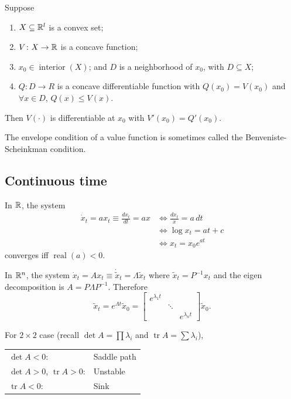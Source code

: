 \documentclass[8pt,letterpaper, landscape]{extarticle} %
\renewcommand{\ln}{\log}
\begin{document}
\begin{multicols}{3}
\begin{description}
 Suppose
\begin{enumerate}
\item $ X \subseteq \mathbb{R}^l $ is a convex set;
\item $ V \colon X \to \mathbb{R} $ is a concave function;
\item $ x_0 \in \operatorname{interior}(X) $; and $ D $ is a neighborhood of $ x_0 $, with $ D \subseteq X $;
\item $ Q \colon D \to R $ is a concave differentiable function with $ Q(x_0) = V(x_0) $ and $ \forall x \in D $, $ Q(x) \leq V(x) $.
\end{enumerate}
Then $ V(\cdot) $ is differentiable at $ x_0 $ with $ V'(x_0) = Q'(x_0) $.

The envelope condition of a value function is sometimes called the Benveniste-Scheinkman condition.

\subsection{Continuous time}
 In $ \mathbb{R} $, the system
\begin{align*}
\dot{x}_t = ax_t \equiv \tfrac{dx_t}{dt} = ax &\iff \tfrac{dx_t}{x} = a \, dt \\
&\iff \ln x_t = at + c \\
&\iff x_t = x_0 e^{at}
\end{align*}
converges iff $ \operatorname{real}(a) < 0 $.

In $ \mathbb{R}^n $, the system $ \dot{x}_t = Ax_t \equiv \dot{\tilde{x}}_t = \Lambda \tilde{x}_t $ where $ \tilde{x}_t = P^{-1} x_t $ and the eigen decomposition is $ A = P \Lambda P^{-1} $. Therefore
$$ \tilde{x}_t = e^{\Lambda t} \tilde{x}_0 = \begin{bmatrix}
e^{\lambda_1 t} & & \\ 
& \ddots & \\
& & e^{\lambda_n t}
\end{bmatrix} \tilde{x}_0. $$

For $ 2 \times 2 $ case (recall $ \det A = \prod \lambda_i $ and $ \operatorname{tr} A = \sum \lambda_i $),
\begin{center}
\begin{tabular}{ll}
$ \det A < 0 $: & Saddle path \\
$ \det A > 0 $, $ \operatorname{tr} A > 0 $: & Unstable \\
\phantom{$ \det A > 0 $,} $ \operatorname{tr} A < 0 $: & Sink
\end{tabular}
\end{center}


\end{description}
\end{multicols}
\end{document}
